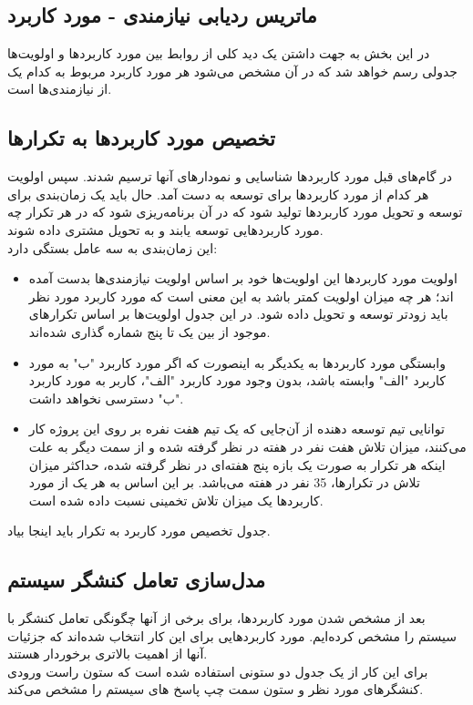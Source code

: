 \documentclass[12pt]{article}
\begin{document}
	\subsection{ماتریس ردیابی نیازمندی - مورد کاربرد}
در این بخش به جهت داشتن یک دید کلی از روابط بین مورد کاربردها و اولویت‌ها جدولی رسم خواهد شد که در آن مشخص می‌شود هر مورد کاربرد مربوط به کدام یک از نیازمندی‌ها است.

	\subsection{تخصیص مورد کاربردها به تکرارها}
	در گام‌های قبل مورد کاربردها شناسایی و نمودارهای آنها ترسیم شدند. سپس اولویت هر کدام از مورد کاربردها برای توسعه به دست آمد.
	حال باید یک زمان‌بندی برای توسعه و تحویل مورد کاربردها تولید شود که در آن برنامه‌ریزی شود که در هر تکرار چه مورد کاربردهایی توسعه یابند و به تحویل مشتری داده شوند.\\
	این زمان‌بندی به سه عامل بستگی دارد:
	\begin{itemize}
		\item اولویت مورد کاربردها
		این اولویت‌ها خود بر اساس اولویت نیازمندی‌ها بدست آمده اند؛ هر چه میزان اولویت کمتر باشد به این معنی است که مورد کاربرد مورد نظر باید زودتر توسعه و تحویل داده شود. در این جدول اولویت‌ها بر اساس تکرارهای موجود از بین یک تا پنج شماره گذاری شده‌اند.
		\item وابستگی مورد کاربردها به یکدیگر
		به اینصورت که اگر مورد کاربرد "ب" به مورد کاربرد "الف" وابسته باشد، بدون وجود مورد کاربرد "الف"، کاربر به مورد کاربرد "ب" دسترسی نخواهد داشت.
		\item توانایی تیم توسعه دهنده
		از آن‌جایی که یک تیم هفت نفره بر روی این پروژه کار می‌کنند، میزان تلاش هفت نفر در هفته در نظر گرفته شده و از سمت دیگر به علت اینکه هر تکرار به صورت یک بازه‌ پنج هفته‌ای در نظر گرفته شده، حداکثر میزان تلاش در تکرارها، 35 نفر در هفته می‌باشد. بر این اساس به هر یک از مورد کاربردها یک میزان تلاش تخمینی نسبت داده شده است.
	\end{itemize}
جدول تخصیص مورد کاربرد به تکرار باید اینجا بیاد.


	\subsection{مدل‌سازی تعامل کنشگر سیستم}
	بعد از مشخص شدن مورد کاربردها، برای برخی از آنها چگونگی تعامل کنشگر با سیستم را مشخص کرده‌ایم. مورد کاربردهایی برای این کار انتخاب شده‌اند که جزئیات آنها از اهمیت بالاتری برخوردار هستند.\\
	برای این کار از یک جدول دو ستونی استفاده شده است که ستون راست ورودی کنشگرهای مورد نظر و ستون سمت چپ پاسخ های سیستم را مشخص می‌کند.
\end{document}
